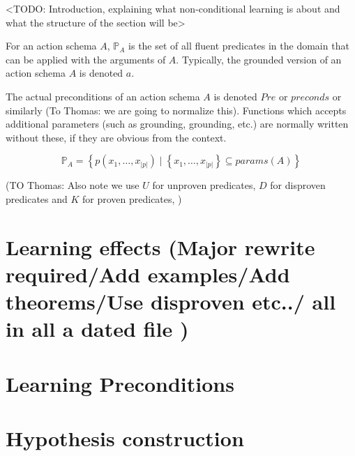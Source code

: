 \documentclass[Master.tex]{subfiles}
\begin{document}
<TODO: Introduction, explaining what non-conditional learning is about and what the structure of the section will be>

For an action schema $A$, $\mathbb{P}_A$ is the set of all fluent predicates in the domain that can be applied with the arguments of $A$. Typically, the grounded version of an action schema $A$ is denoted $a$.

The actual preconditions of an action schema $A$ is denoted $Pre$ or $preconds$ or similarly (To Thomas: we are going to normalize this). Functions which accepts additional parameters (such as grounding, grounding, etc.) are normally written without these, if they are obvious from the context.

\[
\mathbb{P}_A = \left\{
p \left( x_1, \dots, x_{|p|} \right)
\; | \; \left\{ x_1, \dots, x_{|p|} \right\} \subseteq params(A)
\right\}
\]


(TO Thomas: Also note we use $U$ for unproven predicates, $D$ for disproven predicates and $K$ for proven predicates, )

\section{Learning effects (Major rewrite required/Add examples/Add theorems/Use disproven etc../ all in all a dated file )} \label{sec:NC:Effects}
    

    \section{Learning Preconditions}\label{sec:NC:Preconditions}
    

\section{Hypothesis construction}
	
\end{document}

